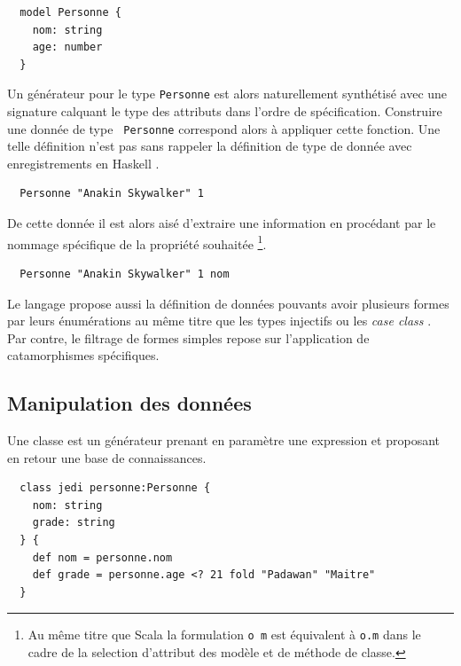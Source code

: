 \documentclass[twoside,a4paper]{article}
\begin{document}
\lstset{language=Thicket}
\begin{lstlisting}
  model Personne {  
    nom: string   
    age: number
  }
\end{lstlisting}

Un  générateur pour  le type  {\tt Personne}  est alors  naturellement
synthétisé  avec une  signature calquant  le type  des attributs  dans
l'ordre  de  spécification.   Construire   une  donnée  de  type  {\tt
  Personne} correspond  alors à  appliquer cette fonction.   Une telle
définition n'est  pas sans  rappeler la définition  de type  de donnée
avec enregistrements en Haskell \cite{haskell}.

\lstset{language=Thicket}
\begin{lstlisting}
  Personne "Anakin Skywalker" 1 
\end{lstlisting}

De  cette donnée  il  est  alors aisé  d'extraire  une information  en
procédant    par   le    nommage    spécifique    de   la    propriété
souhaitée \footnote{Au même  titre que Scala la formulation  {\tt o m}
  est équivalent à {\tt o.m} dans  le cadre de la selection d'attribut
  des modèle et de méthode de classe.}.

\lstset{language=Thicket}
\begin{lstlisting}
  Personne "Anakin Skywalker" 1 nom
\end{lstlisting}

Le  langage propose  aussi  la définition  de  données pouvants  avoir
plusieurs formes  par leurs énumérations  au même titre que  les types
injectifs  \cite{ocaml}   \cite{haskell}  ou  les  {\it   case  class}
\cite{scala}.  Par  contre, le filtrage  de formes simples  repose sur
l'application     de    catamorphismes     \cite{meijer1991functional}
spécifiques.

\subsection{Manipulation des données}

Une classe  est un générateur  prenant en paramètre une  expression et
proposant en retour une base de connaissances.

\lstset{language=Thicket}
\begin{lstlisting}
  class jedi personne:Personne {
    nom: string
    grade: string
  } {
    def nom = personne.nom
    def grade = personne.age <? 21 fold "Padawan" "Maitre"
  }
\end{lstlisting}
\end{document}
